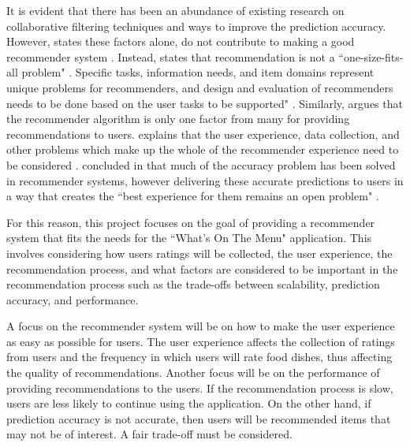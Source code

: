 It is evident that there has been an abundance of existing research on collaborative filtering techniques and ways to improve the prediction accuracy. However, \citeauthor{schafer2007collaborative} states these factors alone, do not contribute to making a good recommender system \cite{schafer2007collaborative}. Instead, \citeauthor{schafer2007collaborative} states that recommendation is not a ``one-size-fits-all problem"  \cite{schafer2007collaborative}. Specific tasks, information needs, and item domains represent unique problems for recommenders, and design and evaluation of recommenders needs to be done based on the user tasks to be supported" \cite{schafer2007collaborative}. Similarly, \citeauthor{martin2009recsys} argues that the recommender algorithm is only one factor from many for providing recommendations to users. \citeauthor{martin2009recsys} explains that the user experience, data collection, and other problems which make up the whole of the recommender experience need to be considered \cite{schafer2007collaborative, martin2009recsys}. \citeauthor{interface} concluded in \cite{interface} that much of the accuracy problem has been solved in recommender systems, however delivering these accurate predictions to users in a way that creates the ``best experience for them remains an open problem" \cite{interface}. 

For this reason, this project focuses on the goal of providing a recommender system that fits the needs for the ``What's On The Menu" application. This involves considering how users ratings will be collected, the user experience, the recommendation process, and what factors are considered to be important in the recommendation process such as the trade-offs between scalability, prediction accuracy, and performance.

A focus on the recommender system will be on how to make the user experience as easy as possible for users. The user experience affects the collection of ratings from users and the frequency in which users will rate food dishes, thus affecting the quality of recommendations. Another focus will be on the performance of providing recommendations to the users.  If the recommendation process is slow, users are less likely to continue using the application. On the other hand, if prediction accuracy is not accurate, then users will be recommended items that may not be of interest. A fair trade-off must be considered. 


